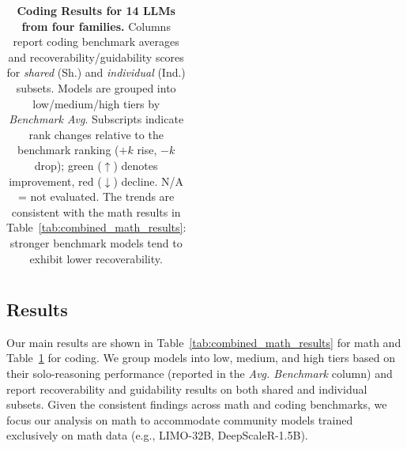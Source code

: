 \documentclass{article} %
\begin{document}
\begin{table}[t]
\begin{tabular}{r|c|c|cc|cc}
    \bottomrule
  \end{tabular}
  \caption{\textbf{Coding Results for 14 LLMs from four families.} Columns report coding benchmark averages and recoverability/guidability scores for \emph{shared} (Sh.) and \emph{individual} (Ind.) subsets. Models are grouped into low/medium/high tiers by \textit{Benchmark Avg}. Subscripts indicate rank changes relative to the benchmark ranking ($+k$ rise, $-k$ drop); green ($\uparrow$) denotes improvement, red ($\downarrow$) decline. N/A = not evaluated. The trends are consistent with the math results in Table~\ref{tab:combined_math_results}: stronger benchmark models tend to exhibit lower recoverability.}
  \label{tab:combined_coding_results}
\end{table}

\subsection{Results}
\label{sec:evaluation_findings}
Our main results are shown in Table~\ref{tab:combined_math_results} for math and Table~\ref{tab:combined_coding_results} for coding. We group models into low, medium, and high tiers based on their solo-reasoning performance (reported in the \textit{Avg. Benchmark} column) and report recoverability and guidability results on both shared and individual subsets. Given the consistent findings across math and coding benchmarks, we focus our analysis on math to accommodate community models trained exclusively on math data (e.g., LIMO-32B, DeepScaleR-1.5B).
    

\captionsetup[figure]{aboveskip=2pt, belowskip=4pt}
\captionsetup[table]{aboveskip=2pt, belowskip=4pt}
\end{document}
